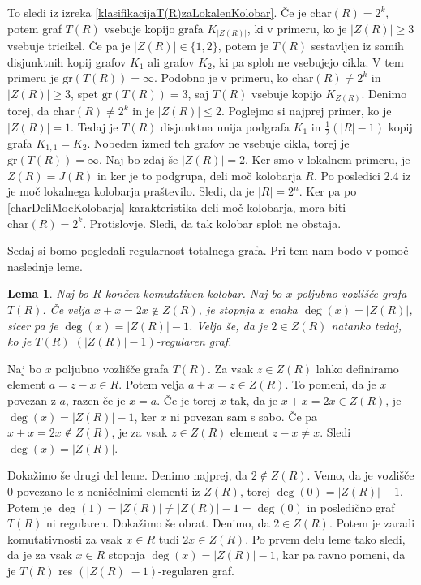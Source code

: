 \documentclass[a4paper, 12pt]{amsart}
\theoremstyle{definition} %
\theoremstyle{plain} %
\newtheorem{lema}[definicija]{Lema}
\begin{document}
\proof
To sledi iz izreka \ref{klasifikacijaT(R)zaLokalenKolobar}. Če je $\textrm{char}(R) = 2^k$, potem graf $T(R)$ vsebuje kopijo grafa $K_{|Z(R)|}$, ki v primeru, ko je $|Z(R)| \ge 3$ vsebuje tricikel. Če pa je $|Z(R)| \in \{1,2\}$, potem je $T(R)$ sestavljen iz samih disjunktnih kopij grafov $K_1$ ali grafov $K_2$, ki pa sploh ne vsebujejo cikla. V tem primeru je $\textrm{gr}(T(R)) = \infty$. Podobno je v primeru, ko $\textrm{char}(R) \neq 2^k$ in $|Z(R)| \ge 3$, spet $\textrm{gr}(T(R)) = 3$, saj $T(R)$ vsebuje kopijo $K_{Z(R)}$. Denimo torej, da $\textrm{char}(R) \neq 2^k$ in je $|Z(R)| \le 2$. Poglejmo si najprej primer, ko je $|Z(R)| = 1$. Tedaj je $T(R)$ disjunktna unija podgrafa $K_1$ in $\frac{1}{2}(|R| - 1)$ kopij grafa $K_{1,1} = K_2$. Nobeden izmed teh grafov ne vsebuje cikla, torej je $\textrm{gr} (T(R)) = \infty$. Naj bo zdaj še $|Z(R)| = 2$. Ker smo v lokalnem primeru, je $Z(R) = J(R)$ in ker je to podgrupa, deli moč kolobarja $R$. Po posledici 2.4 iz \cite{diploma} je moč lokalnega kolobarja praštevilo. Sledi, da je $|R| = 2^n$. Ker pa po \ref{charDeliMocKolobarja} karakteristika deli moč kolobarja, mora biti $\textrm{char}(R) = 2^k$. Protislovje. Sledi, da tak kolobar sploh ne obstaja.
\endproof

Sedaj si bomo pogledali regularnost totalnega grafa. Pri tem nam bodo v pomoč naslednje leme.

\begin{lema}
\label{regular1}
Naj bo $R$ končen komutativen kolobar. Naj bo $x$ poljubno vozlišče grafa $T(R)$. Če velja $x+x = 2x \notin Z(R)$, je stopnja $x$ enaka $\deg(x) = |Z(R)|$, sicer pa je $\deg(x) = |Z(R)| -1$. Velja še, da je  $2\in Z(R)$ natanko tedaj, ko je $T(R)$ $(|Z(R)| - 1)$-regularen graf. 
\end{lema}

\proof
Naj bo $x$ poljubno vozlišče grafa $T(R)$. Za vsak $z\in Z(R)$ lahko definiramo element $a = z -x \in R$. Potem velja $a + x = z\in Z(R)$. To pomeni, da je $x$ povezan z $a$, razen če je $x=a$. Če je torej $x$ tak, da je $x+x = 2x \in Z(R)$, je $\deg(x) = |Z(R)| - 1$, ker $x$ ni povezan sam s sabo. Če pa $x+x=2x \notin Z(R)$, je za vsak $z\in Z(R)$ element $z-x \neq x$. Sledi $\deg(x) = |Z(R)|$.

Dokažimo še drugi del leme. Denimo najprej, da $2\notin Z(R)$. Vemo, da je vozlišče 0 povezano le z neničelnimi elementi iz $Z(R)$, torej $\deg(0)=  |Z(R)| -1 $. Potem je $\deg(1) = |Z(R) | \neq |Z(R)| - 1= \deg(0)$ in posledično graf $T(R)$ ni regularen. 
Dokažimo še obrat. Denimo, da $2  \in Z(R)$. Potem je zaradi komutativnosti za vsak $x\in R$ tudi $2x\in Z(R)$. Po prvem delu leme tako sledi, da je za vsak $x\in R$ stopnja $\deg(x) = |Z(R)| - 1$, kar pa ravno pomeni, da je $T(R)$ res $(|Z(R)| -1)$-regularen graf.
\endproof
\end{document}
